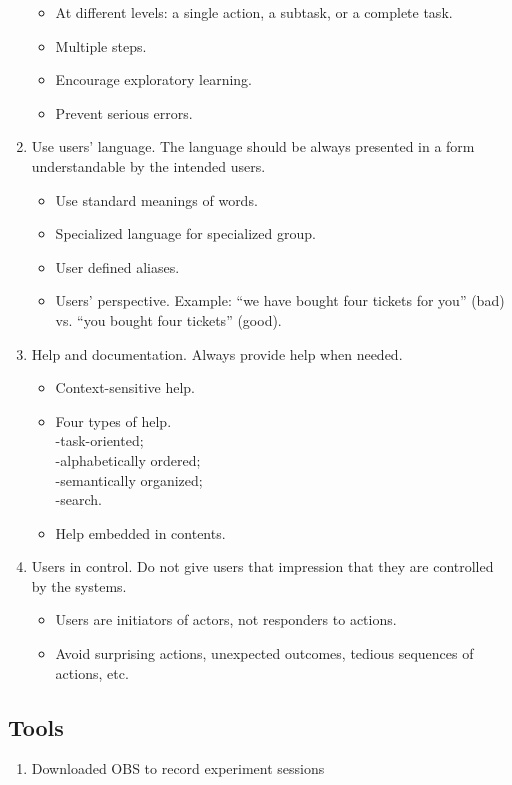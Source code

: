 \documentclass[letterpaper,cleveref]{lipics-v2019}
\theoremstyle{definition}
\begin{document}
\begin{enumerate}
\begin {itemize}
\item At different levels: a single action, a subtask, or a complete task.
\item Multiple steps.
\item Encourage exploratory learning.
\item Prevent serious errors.
\end {itemize}
\item Use users’ language. The language should be always presented in a form understandable by the intended users.
\begin{itemize}
\item Use standard meanings of words.
\item Specialized language for specialized group.
\item User defined aliases.
\item Users’ perspective. Example: “we have bought four tickets for you” (bad) vs. “you bought four tickets” (good).
\end {itemize}
\item Help and documentation. Always provide help when needed. 
\begin {itemize}
\item Context-sensitive help.
\item Four types of help.\\
-task-oriented;\\
-alphabetically ordered;\\
-semantically organized;\\
-search.
\item Help embedded in contents.
\end {itemize}
\item Users in control. Do not give users that impression that they are controlled by the systems. 
\begin {itemize}
\item Users are initiators of actors, not responders to actions.
\item Avoid surprising actions, unexpected outcomes, tedious sequences of actions, etc.
\end {itemize}
\end{enumerate}
\subsection{Tools}
\begin {enumerate} 
\item Downloaded OBS to record experiment sessions
\end {enumerate}
\end{document}

